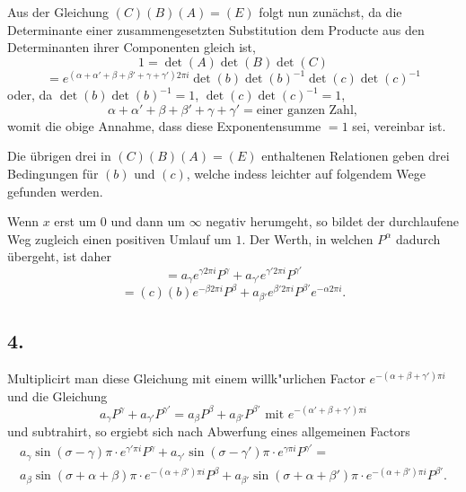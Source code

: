 \documentclass[12pt,a4paper]{book}
\theoremstyle{definition}
\theoremstyle{remark}
\begin{document}
Aus der Gleichung $(C)(B)(A) = (E)$ folgt nun zunächst, da die Determinante einer zusammengesetzten Substitution dem Producte aus den Determinanten ihrer Componenten gleich ist,
\[
1 = \det(A) \det(B) \det(C)
\]
\[
= e^{(\alpha+\alpha'+\beta+\beta'+\gamma+\gamma')2\pi i} \det(b) \det(b)^{-1} \det(c) \det(c)^{-1}
\]
oder, da $\det(b) \det(b)^{-1} = 1$, $\det(c) \det(c)^{-1} = 1$,
\begin{equation}
\alpha + \alpha' + \beta + \beta' + \gamma + \gamma' = \text{einer ganzen Zahl}, \tag{2}
\end{equation}
womit die obige Annahme, dass diese Exponentensumme $= 1$ sei, vereinbar ist.

Die übrigen drei in $(C)(B)(A) = (E)$ enthaltenen Relationen geben drei Bedingungen für $(b)$ und $(c)$, welche indess leichter auf folgendem Wege gefunden werden.

Wenn $x$ erst um $0$ und dann um $\infty$ negativ herumgeht, so bildet der durchlaufene Weg zugleich einen positiven Umlauf um $1$. Der Werth, in welchen $P^{\alpha}$ dadurch übergeht, ist daher
\[
= a_{\gamma} e^{\gamma 2\pi i} P^{\gamma} + a_{\gamma'} e^{\gamma' 2\pi i} P^{\gamma'}
\]
\[
= (c)(b) e^{-\beta 2\pi i} P^{\beta} + a_{\beta'} e^{\beta' 2\pi i} P^{\beta'} e^{-\alpha 2\pi i}.
\]

\subsection*{4.}

Multiplicirt man diese Gleichung mit einem willk{"u}rlichen Factor $e^{-(\alpha+\beta+\gamma')\pi i}$ und die Gleichung
\[
a_{\gamma} P^{\gamma} + a_{\gamma'} P^{\gamma'} = a_{\beta} P^{\beta} + a_{\beta'} P^{\beta'} \text{ mit } e^{-(\alpha'+\beta+\gamma')\pi i}
\]
und subtrahirt, so ergiebt sich nach Abwerfung eines allgemeinen Factors
\begin{multline*}
a_{\gamma} \sin(\sigma - \gamma)\pi \cdot e^{\gamma'\pi i} P^{\gamma} + a_{\gamma'} \sin(\sigma - \gamma')\pi \cdot e^{\gamma\pi i} P^{\gamma'} = \\
a_{\beta} \sin(\sigma + \alpha + \beta)\pi \cdot e^{-(\alpha+\beta')\pi i} P^{\beta} + a_{\beta'} \sin(\sigma + \alpha + \beta')\pi \cdot e^{-(\alpha+\beta')\pi i} P^{\beta'}.
\end{multline*}
\end{document}
